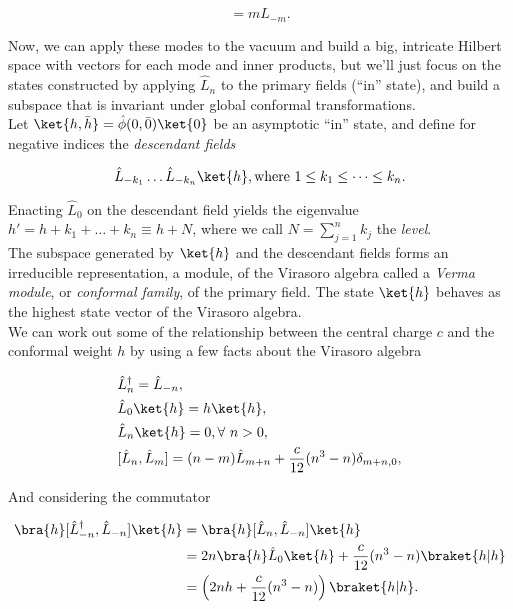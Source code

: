 \begin{equation}
[ \hat{L}_0, \hat{L}_{-m} ] = m \hat{L}_{-m}.
\end{equation}

\noindent Now, we can apply these modes to the vacuum and build a big, intricate Hilbert space with vectors for each mode and inner products, but we'll just focus on the states constructed by applying $\hat{L}_n$ to the primary fields (``in'' state), and build a subspace that is invariant under global conformal transformations. \\

\noindent Let $\ket{h, \bar{h}} = \hat{\phi} (0, \bar{0}) \ket{0}$ be an asymptotic ``in'' state, and define for negative indices the \textit{descendant fields}

\begin{equation}
\hat{L}_{-k_1} \dots \hat{L}_{-k_n} \ket{h}, \text{where } 1 \le k_1 \le \dots \le k_n.
\end{equation}

\noindent Enacting $\hat{L}_0$ on the descendant field yields the eigenvalue $h' = h + k_1 + \dots + k_n \equiv h + N$, where we call $N = \sum_{j=1}^n k_j$ the \textit{level}. \\

\noindent The subspace generated by $\ket{h}$ and the descendant fields forms an irreducible representation, a module, of the Virasoro algebra called a \textit{Verma module}, or \textit{conformal family}, of the primary field. The state $\ket{h}$ behaves as the highest state vector of the Virasoro algebra. \\

\noindent We can work out some of the relationship between the central charge $c$ and the conformal weight $h$ by using a few facts about the Virasoro algebra

\begin{align}
&\hat{L}_n^\dagger = \hat{L}_{-n}, \\
&\hat{L}_0 \ket{h} = h \ket{h}, \\
&\hat{L}_n \ket{h} = 0, \forall \,\, n>0, \\
&[ \hat{L}_n , \hat{L}_m ] = (n-m) \hat{L}_{m+n} + \frac{c}{12} (n^3 - n) \delta_{m+n,0},
\end{align}

\noindent And considering the commutator

\begin{align}
\bra{h} [ \hat{L}_{-n}^\dagger, \hat{L}_{-n} ] \ket{h} &= \bra{h} [ \hat{L}_n, \hat{L}_{-n} ] \ket{h} \\
&= 2n \bra{h} \hat{L}_0 \ket{h} + \frac{c}{12} (n^3 - n) \braket{h|h} \\
&= \left( 2nh + \frac{c}{12} (n^3 - n) \right) \braket{h|h}.
\end{align}

